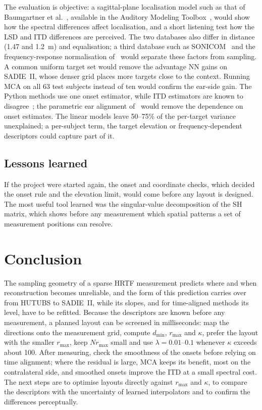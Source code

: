 \documentclass[11pt,a4paper]{article}
\newcommand{\dmin}{d_{\min}}
\newcommand{\rmax}{r_{\max}}
\begin{document}
The evaluation is objective: a sagittal-plane localisation model such as that of Baumgartner et al.~\cite{baumgartner2014}, available in the Auditory Modeling Toolbox~\cite{majdak2022amt}, would show how the spectral differences affect localisation, and a short listening test how the LSD and ITD differences are perceived. The two databases also differ in distance (1.47 and 1.2~m) and equalisation; a third database such as SONICOM~\cite{engel2023} and the frequency-response normalisation of~\cite{wen2023} would separate these factors from sampling. A common uniform target set would remove the advantage NN gains on SADIE~II, whose denser grid places more targets close to the context. Running MCA on all 63 test subjects instead of ten would confirm the ear-side gain. The Python methods use one onset estimator, while ITD estimators are known to disagree~\cite{katz2014}; the parametric ear alignment of~\cite{benhur2019} would remove the dependence on onset estimates. The linear models leave 50--75\% of the per-target variance unexplained; a per-subject term, the target elevation or frequency-dependent descriptors could capture part of it.

\subsection{Lessons learned}

If the project were started again, the onset and coordinate checks, which decided the onset rule and the elevation limit, would come before any layout is designed. The most useful tool learned was the singular-value decomposition of the SH matrix, which shows before any measurement which spatial patterns a set of measurement positions can resolve.

\section{Conclusion}

The sampling geometry of a sparse HRTF measurement predicts where and when reconstruction becomes unreliable, and the form of this prediction carries over from HUTUBS to SADIE~II, while its slopes, and for time-aligned methods its level, have to be refitted. Because the descriptors are known before any measurement, a planned layout can be screened in milliseconds: map the directions onto the measurement grid, compute $\dmin$, $\rmax$ and $\kappa$, prefer the layout with the smaller $\rmax$, keep $N\rmax$ small and use $\lambda=0.01$--$0.1$ whenever $\kappa$ exceeds about 100. After measuring, check the smoothness of the onsets before relying on time alignment; where the residual is large, MCA keeps its benefit, most on the contralateral side, and smoothed onsets improve the ITD at a small spectral cost. The next steps are to optimise layouts directly against $\rmax$ and $\kappa$, to compare the descriptors with the uncertainty of learned interpolators and to confirm the differences perceptually.
\end{document}
